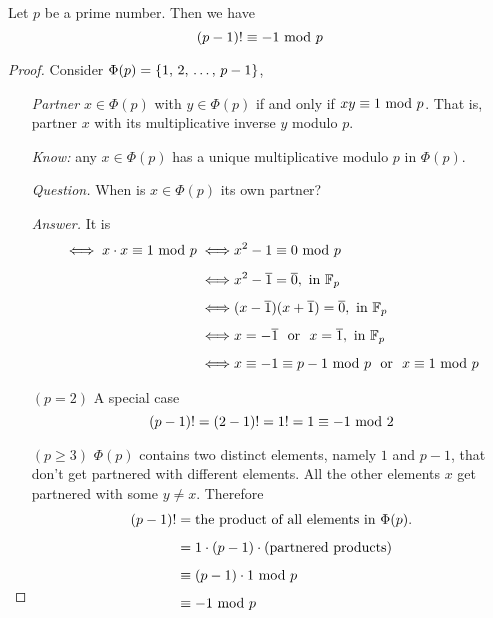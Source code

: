 \begin{theorem}[Wilson]\label{wilsonthm}
Let $p$ be a prime number. Then we have
\[(p-1)! \equiv -1\text{ mod }{p}\]
\end{theorem}
\begin{proof}
Consider $\Phi(p) = \left\{1,\,2,\,\ldots,\,p-1\right\}$,
\begin{itemize}[leftmargin=*]
\item[] \emph{Partner} $x \in \Phi(p)$ with $y \in \Phi(p)$ if and only if $xy \equiv 1\text{ mod }{p}$. That is, partner $x$ with its multiplicative inverse $y$ modulo $p$.
\item[] \emph{Know:} any $x \in \Phi(p)$ has a unique multiplicative modulo $p$ in $\Phi(p)$.
\item[] \emph{Question.} When is $x \in \Phi(p)$ its own partner?
\item[] \emph{Answer.} It is
\begin{align*}
\iff x\cdot x \equiv 1 \text{ mod }{p} \iff& x^2 - 1 \equiv 0 \text{ mod }{p}\\[0.5em]
\iff& x^2 - \overline{1} = \overline{0},\text{ in }\mathbb F_p\\[0.5em]
\iff& (x - \overline{1})(x + \overline{1}) = \overline{0}, \text{ in }\mathbb F_p\\[0.5em]
\iff& x = - \overline{1}\ \text{ or }\ x = \overline{1}, \text{ in }\mathbb F_p\\[0.5em]
\iff& x \equiv -1 \equiv p-1\text{ mod }{p}\ \text{ or }\ x \equiv 1 \text{ mod }{p}
\end{align*}
\end{itemize}
\begin{itemize}[leftmargin=4.5em]
\item[$(p = 2)$] A special case 
\[(p-1)! = (2-1)! = 1! = 1 \equiv -1\text{ mod }{2}\]
\item[$(p\geq 3)$] $\Phi(p)$ contains two distinct elements, namely $1$ and $p-1$, that don't get partnered with different elements. All the other elements $x$ get partnered with some $y \neq x$. Therefore
\begin{align*}
(p-1)! &= \text{the product of all elements in $\Phi(p)$.}\\[0.5em]
&= 1\cdot(p-1)\cdot(\text{partnered products})\\[0.5em]
&\equiv (p-1)\cdot 1\text{ mod }{p}\\[0.5em]
&\equiv -1\text{ mod }{p}\\[-3em]
\end{align*}
\end{itemize}
\end{proof}

